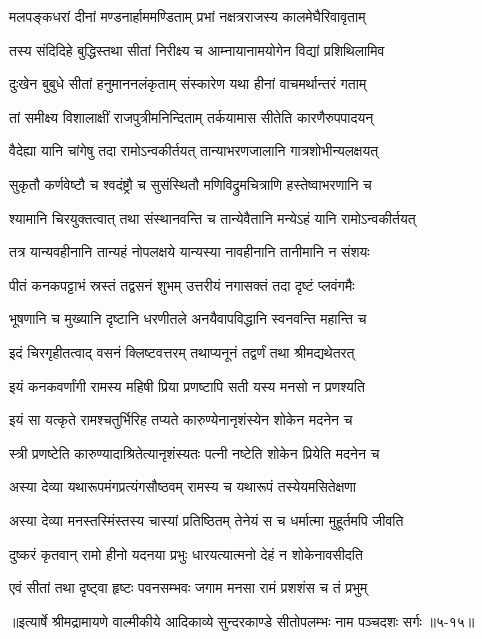 \twolineshloka
{मलपङ्कधरां दीनां मण्डनार्हाममण्डिताम्}
{प्रभां नक्षत्रराजस्य कालमेघैरिवावृताम्} %

\twolineshloka
{तस्य संदिदिहे बुद्धिस्तथा सीतां निरीक्ष्य च}
{आम्नायानामयोगेन विद्यां प्रशिथिलामिव} %

\twolineshloka
{दुःखेन बुबुधे सीतां हनुमाननलंकृताम्}
{संस्कारेण यथा हीनां वाचमर्थान्तरं गताम्} %

\twolineshloka
{तां समीक्ष्य विशालाक्षीं राजपुत्रीमनिन्दिताम्}
{तर्कयामास सीतेति कारणैरुपपादयन्} %

\twolineshloka
{वैदेह्या यानि चांगेषु तदा रामोऽन्वकीर्तयत्}
{तान्याभरणजालानि गात्रशोभीन्यलक्षयत्} %

\twolineshloka
{सुकृतौ कर्णवेष्टौ च श्वदंष्ट्रौ च सुसंस्थितौ}
{मणिविद्रुमचित्राणि हस्तेष्वाभरणानि च} %

\twolineshloka
{श्यामानि चिरयुक्तत्वात् तथा संस्थानवन्ति च}
{तान्येवैतानि मन्येऽहं यानि रामोऽन्वकीर्तयत्} %

\twolineshloka
{तत्र यान्यवहीनानि तान्यहं नोपलक्षये}
{यान्यस्या नावहीनानि तानीमानि न संशयः} %

\twolineshloka
{पीतं कनकपट्टाभं स्रस्तं तद्वसनं शुभम्}
{उत्तरीयं नगासक्तं तदा दृष्टं प्लवंगमैः} %

\twolineshloka
{भूषणानि च मुख्यानि दृष्टानि धरणीतले}
{अनयैवापविद्धानि स्वनवन्ति महान्ति च} %

\twolineshloka
{इदं चिरगृहीतत्वाद् वसनं क्लिष्टवत्तरम्}
{तथाप्यनूनं तद्वर्णं तथा श्रीमद्यथेतरत्} %

\twolineshloka
{इयं कनकवर्णांगी रामस्य महिषी प्रिया}
{प्रणष्टापि सती यस्य मनसो न प्रणश्यति} %

\twolineshloka
{इयं सा यत्कृते रामश्चतुर्भिरिह तप्यते}
{कारुण्येनानृशंस्येन शोकेन मदनेन च} %

\twolineshloka
{स्त्री प्रणष्टेति कारुण्यादाश्रितेत्यानृशंस्यतः}
{पत्नी नष्टेति शोकेन प्रियेति मदनेन च} %

\twolineshloka
{अस्या देव्या यथारूपमंगप्रत्यंगसौष्ठवम्}
{रामस्य च यथारूपं तस्येयमसितेक्षणा} %

\twolineshloka
{अस्या देव्या मनस्तस्मिंस्तस्य चास्यां प्रतिष्ठितम्}
{तेनेयं स च धर्मात्मा मुहूर्तमपि जीवति} %

\twolineshloka
{दुष्करं कृतवान् रामो हीनो यदनया प्रभुः}
{धारयत्यात्मनो देहं न शोकेनावसीदति} %

\twolineshloka
{एवं सीतां तथा दृष्ट्वा हृष्टः पवनसम्भवः}
{जगाम मनसा रामं प्रशशंस च तं प्रभुम्} %


॥इत्यार्षे श्रीमद्रामायणे वाल्मीकीये आदिकाव्ये सुन्दरकाण्डे सीतोपलम्भः नाम पञ्चदशः सर्गः ॥५-१५॥

